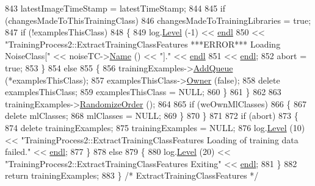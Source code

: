 \begin{DoxyCode}
843         latestImageTimeStamp = latestTimeStamp;
844 
845       \textcolor{keywordflow}{if}  (changesMadeToThisTrainingClass)
846         changesMadeToTrainingLibraries = \textcolor{keyword}{true};
847       \textcolor{keywordflow}{if}  (!examplesThisClass)
848       \{
849         log.\hyperlink{class_k_k_b_1_1_run_log_a32cf761d7f2e747465fd80533fdbb659}{Level} (-1) << \hyperlink{namespace_k_k_b_ad1f50f65af6adc8fa9e6f62d007818a8}{endl}
850           << \textcolor{stringliteral}{"TrainingProcess2::ExtractTrainingClassFeatures   ***ERROR***   Loading NoiseClass["} << 
      noiseTC->\hyperlink{class_k_k_m_l_l_1_1_training_class_ae10b765db09d3aadabdffa35960c906a}{Name} () << \textcolor{stringliteral}{"]."} << \hyperlink{namespace_k_k_b_ad1f50f65af6adc8fa9e6f62d007818a8}{endl}
851           << \hyperlink{namespace_k_k_b_ad1f50f65af6adc8fa9e6f62d007818a8}{endl};
852         abort = \textcolor{keyword}{true};
853       \}
854       \textcolor{keywordflow}{else}
855       \{
856         trainingExamples->\hyperlink{class_k_k_m_l_l_1_1_feature_vector_list_a90809e07f7e33e591da0d266c1907ca9}{AddQueue} (*examplesThisClass);
857         examplesThisClass->\hyperlink{class_k_k_b_1_1_k_k_queue_a4990d037ff09dd504cc7df53819bf61a}{Owner} (\textcolor{keyword}{false});
858         \textcolor{keyword}{delete}  examplesThisClass;
859         examplesThisClass = NULL;
860       \}
861     \}
862 
863     trainingExamples->\hyperlink{class_k_k_b_1_1_k_k_queue_ab43920c3ec182b87d3affa1e1611e1b0}{RandomizeOrder} ();
864 
865     \textcolor{keywordflow}{if}  (weOwnMlClasses)
866     \{
867       \textcolor{keyword}{delete}  mlClasses;
868       mlClasses = NULL;
869     \}
870   \}
871 
872   \textcolor{keywordflow}{if}  (abort)
873   \{
874     \textcolor{keyword}{delete}  trainingExamples;
875     trainingExamples = NULL;
876     log.\hyperlink{class_k_k_b_1_1_run_log_a32cf761d7f2e747465fd80533fdbb659}{Level} (10) << \textcolor{stringliteral}{"TrainingProcess2::ExtractTrainingClassFeatures   Loading of training data
       failed."} << \hyperlink{namespace_k_k_b_ad1f50f65af6adc8fa9e6f62d007818a8}{endl};
877   \}
878   \textcolor{keywordflow}{else}
879   \{
880     log.\hyperlink{class_k_k_b_1_1_run_log_a32cf761d7f2e747465fd80533fdbb659}{Level} (20) << \textcolor{stringliteral}{"TrainingProcess2::ExtractTrainingClassFeatures   Exiting"} << 
      \hyperlink{namespace_k_k_b_ad1f50f65af6adc8fa9e6f62d007818a8}{endl};
881   \}
882   \textcolor{keywordflow}{return}  trainingExamples;
883 \}  \textcolor{comment}{/*  ExtractTrainingClassFeatures */}
\end{DoxyCode}
